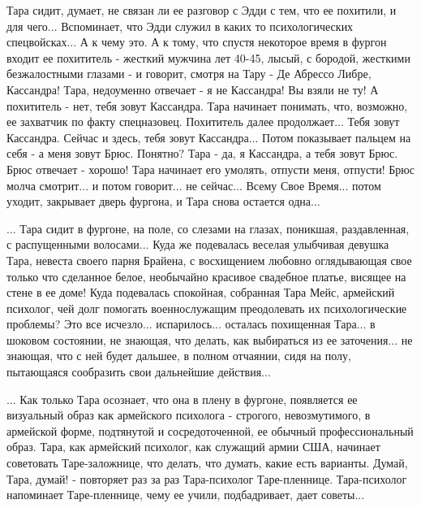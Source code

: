 Тара сидит, думает, не связан ли ее разговор с Эдди с тем, что ее похитили, и
для чего...  Вспоминает, что Эдди служил в каких то психологических
спецвойсках...  А к чему это. А к тому, что спустя некоторое время в фургон
входит ее похититель - жесткий мужчина лет 40-45, лысый, с бородой, жесткими
безжалостными глазами - и говорит, смотря на Тару - Де Абрессо Либре,
Кассандра!  Тара, недоуменно отвечает - я не Кассандра! Вы взяли не ту! А
похититель - нет, тебя зовут Кассандра.  Тара начинает понимать, что, возможно,
ее захватчик по факту спецназовец. Похититель далее продолжает...  Тебя зовут
Кассандра. Сейчас и здесь, тебя зовут Кассандра... Потом показывает пальцем на
себя - а меня зовут Брюс.  Понятно? Тара - да, я Кассандра, а тебя зовут Брюс.
Брюс отвечает - хорошо! Тара начинает его умолять, отпусти меня, отпусти! Брюс
молча смотрит... и потом говорит... не сейчас... Всему Свое Время... потом
уходит, закрывает дверь фургона, и Тара снова остается одна...

... Тара сидит в фургоне, на поле, со слезами на глазах, поникшая,
раздавленная, с распущенными волосами... Куда же подевалась веселая улыбчивая
девушка Тара, невеста своего парня Брайена, с восхищением любовно оглядывающая
свое только что сделанное белое, необычайно красивое свадебное платье, висящее
на стене в ее доме! Куда подевалась спокойная, собранная Тара Мейс, армейский
психолог, чей долг помогать военнослужащим преодолевать их психологические
проблемы? Это все исчезло... испарилось...  осталась похищенная Тара... в
шоковом состоянии, не знающая, что делать, как выбираться из ее заточения...
не знающая, что с ней будет дальшее, в полном отчаянии, сидя на полу,
пытающаяся сообразить свои дальнейшие действия... 

... Как только Тара осознает, что она в плену в фургоне, появляется ее
визуальный образ как армейского психолога - строгого, невозмутимого, в
армейской форме, подтянутой и сосредоточенной, ее обычный профессиональный
образ. Тара, как армейский психолог, как служащий армии США, начинает
советовать Таре-заложнице, что делать, что думать, какие есть варианты. Думай,
Тара, думай! - повторяет раз за раз Тара-психолог Таре-пленнице. Тара-психолог
напоминает Таре-пленнице, чему ее учили, подбадривает, дает советы... 


